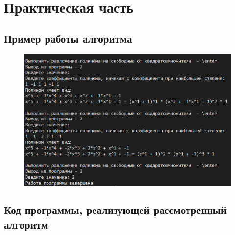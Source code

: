 \documentclass[bachelor, och, labwork]{shiza}
\begin{document}
\section{Практическая часть}
\subsection{Пример работы алгоритма}
\begin{figure}[H]
    \centering
    \includegraphics[width=1\textwidth]{pic1.png}
    \caption{}
\end{figure}


    \subsection{Код программы, реализующей рассмотренный алгоритм}
        \inputminted{python}{lab17.py}
\end{document}
